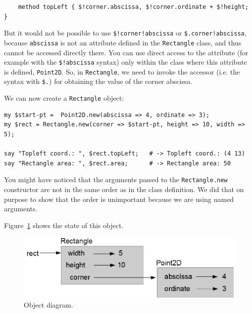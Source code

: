 \begin{verbatim}
    method topLeft { $!corner.abscissa, $!corner.ordinate + $!height; }
\end{verbatim}

But it would not be possible to use \verb'$!corner!abscissa' or 
\verb'$.corner!abscissa', because {\tt abscissa} is not an 
attribute defined in the {\tt Rectangle} class, and thus cannot 
be accessed directly there. You can use direct access 
to the attribute (for example with the \verb'$!abscissa' syntax) 
only within the class where this attribute is defined, 
{\tt Point2D}. So, in {\tt Rectangle}, we need to invoke the 
accessor (i.e. the syntax with \verb'$.') for obtaining the 
value of the corner abscissa.

We can now create a {\tt Rectangle} object:

\begin{verbatim}
my $start-pt =  Point2D.new(abscissa => 4, ordinate => 3);
my $rect = Rectangle.new(corner => $start-pt, height => 10, width => 5);

say "Topleft coord.: ", $rect.topLeft;   # -> Topleft coord.: (4 13)
say "Rectangle area: ", $rect.area;      # -> Rectangle area: 50
\end{verbatim}

You might have noticed that the arguments passed to the 
{\tt Rectangle.new} constructor are not in the same order as 
in the class definition. We did that on purpose 
to show that the order is unimportant because we 
are using named arguments.

Figure~\ref{fig.rectangle} shows the state of this object.

\begin{figure}
\centerline
{\includegraphics[scale=0.8]{figs/rectangle.png}}
\caption{Object diagram.}
\label{fig.rectangle}
\end{figure}


